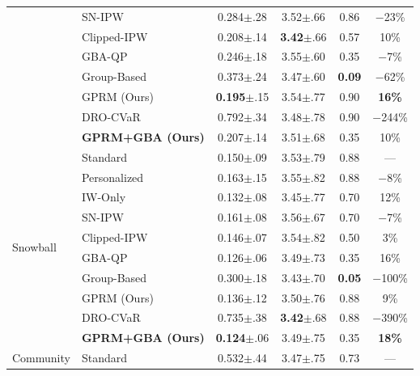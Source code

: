 \documentclass{article}
\theoremstyle{plain}
\theoremstyle{definition}
\theoremstyle{remark}
\begin{document}
\begin{table}[ht]
{\begin{tabular}{llcccc}
& SN-IPW & 0.284{\tiny$\pm$.28} & 3.52{\tiny$\pm$.66} & 0.86 & $-$23\% \\
& Clipped-IPW & 0.208{\tiny$\pm$.14} & \cellcolor{bestgreen}\textbf{3.42}{\tiny$\pm$.66} & 0.57 & 10\% \\
& GBA-QP & 0.246{\tiny$\pm$.18} & 3.55{\tiny$\pm$.60} & 0.35 & $-$7\% \\
& Group-Based & 0.373{\tiny$\pm$.24} & 3.47{\tiny$\pm$.60} & \cellcolor{bestgreen}\textbf{0.09} & $-$62\% \\
& \cellcolor{bestgreen}GPRM (Ours) & \cellcolor{bestgreen}\textbf{0.195}{\tiny$\pm$.15} & 3.54{\tiny$\pm$.77} & 0.90 & \cellcolor{bestgreen}\textbf{16\%} \\
& DRO-CVaR & 0.792{\tiny$\pm$.34} & 3.48{\tiny$\pm$.78} & 0.90 & $-$244\% \\
& \cellcolor{goodblue}\textbf{GPRM+GBA (Ours)} & \cellcolor{goodblue}0.207{\tiny$\pm$.14} & \cellcolor{goodblue}3.51{\tiny$\pm$.68} & \cellcolor{goodblue}0.35 & \cellcolor{goodblue}10\% \\
\midrule
\multirow{10}{*}{Snowball}
& \cellcolor{neutralgray}Standard & \cellcolor{neutralgray}0.150{\tiny$\pm$.09} & \cellcolor{neutralgray}3.53{\tiny$\pm$.79} & \cellcolor{neutralgray}0.88 & \cellcolor{neutralgray}--- \\
& Personalized & 0.163{\tiny$\pm$.15} & 3.55{\tiny$\pm$.82} & 0.88 & $-$8\% \\
& IW-Only & 0.132{\tiny$\pm$.08} & 3.45{\tiny$\pm$.77} & 0.70 & 12\% \\
& SN-IPW & 0.161{\tiny$\pm$.08} & 3.56{\tiny$\pm$.67} & 0.70 & $-$7\% \\
& Clipped-IPW & 0.146{\tiny$\pm$.07} & 3.54{\tiny$\pm$.82} & 0.50 & 3\% \\
& GBA-QP & 0.126{\tiny$\pm$.06} & 3.49{\tiny$\pm$.73} & 0.35 & 16\% \\
& Group-Based & 0.300{\tiny$\pm$.18} & 3.43{\tiny$\pm$.70} & \cellcolor{bestgreen}\textbf{0.05} & $-$100\% \\
& GPRM (Ours) & 0.136{\tiny$\pm$.12} & 3.50{\tiny$\pm$.76} & 0.88 & 9\% \\
& DRO-CVaR & 0.735{\tiny$\pm$.38} & \cellcolor{bestgreen}\textbf{3.42}{\tiny$\pm$.68} & 0.88 & $-$390\% \\
& \cellcolor{goodblue}\textbf{GPRM+GBA (Ours)} & \cellcolor{bestgreen}\textbf{0.124}{\tiny$\pm$.06} & \cellcolor{goodblue}3.49{\tiny$\pm$.75} & \cellcolor{goodblue}0.35 & \cellcolor{bestgreen}\textbf{18\%} \\
\midrule
\multirow{10}{*}{Community}
& \cellcolor{neutralgray}Standard & \cellcolor{neutralgray}0.532{\tiny$\pm$.44} & \cellcolor{neutralgray}3.47{\tiny$\pm$.75} & \cellcolor{neutralgray}0.73 & \cellcolor{neutralgray}--- \\

\end{tabular}}
\end{table}
\end{document}
